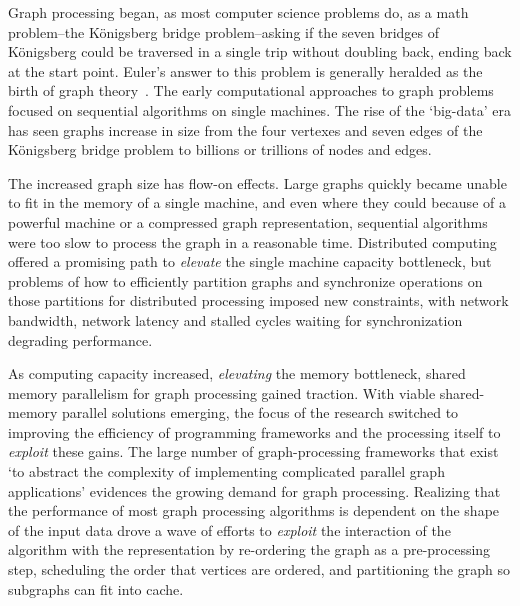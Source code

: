 Graph processing began, as most computer science problems do, as a math problem--the K{\"o}nigsberg bridge problem--asking if the seven bridges of K{\"o}nigsberg could be traversed in a single trip without doubling back, ending back at the start point. 
Euler's answer to this problem is generally heralded as the birth of graph theory~\cite{Barnett2005}.
The early computational approaches to graph problems focused on sequential algorithms on single machines. 
The rise of the `big-data' era has seen graphs increase in size from the four vertexes and seven edges of the K{\"o}nigsberg bridge problem to billions or trillions of nodes and edges. 

The increased graph size has flow-on effects. 
Large graphs quickly became unable to fit in the memory of a single machine, and even where they could because of a powerful machine or a compressed graph representation, sequential algorithms were too slow to process the graph in a reasonable time. 
Distributed computing offered a promising path to \textit{elevate} the single machine capacity bottleneck, but problems of how to efficiently partition graphs and synchronize operations on those partitions for distributed processing imposed new constraints, with network bandwidth, network latency and stalled cycles waiting for synchronization degrading performance. 

As computing capacity increased, \textit{elevating} the memory bottleneck, shared memory parallelism for graph processing gained traction.
With viable shared-memory parallel solutions emerging, the focus of the research switched to improving the efficiency of programming frameworks and the processing itself to \textit{exploit} these gains. 
The large number of graph-processing frameworks that exist `to abstract the complexity of implementing complicated parallel graph applications' evidences the growing demand for graph processing. 
Realizing that the performance of most graph processing algorithms is dependent on the shape of the input data drove a wave of efforts to \textit{exploit} the interaction of the algorithm with the representation by re-ordering the graph as a pre-processing step, scheduling the order that vertices are ordered, and partitioning the graph so subgraphs can fit into cache. 

